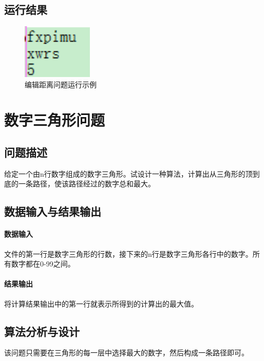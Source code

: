 \documentclass[UTF8]{ctexart}
\begin{document}
    \subsection{运行结果}
    \begin{figure}[!htb]
      \centering
      \includegraphics[width=0.3\textwidth]{../img/2.PNG}
      \caption{编辑距离问题运行示例}\label{编辑距离问题运行示例}
    \end{figure}

    \section{数字三角形问题}
    \subsection{问题描述}
    给定一个由n行数字组成的数字三角形。试设计一种算法，计算出从三角形的顶到底的一条路径，使该路径经过的数字总和最大。

    \subsection{数据输入与结果输出}
    \paragraph{数据输入}
    文件的第一行是数字三角形的行数，接下来的n行是数字三角形各行中的数字。所有数字都在0-99之间。

    \paragraph{结果输出}
    将计算结果输出中的第一行就表示所得到的计算出的最大值。

    \subsection{算法分析与设计}
    该问题只需要在三角形的每一层中选择最大的数字，然后构成一条路径即可。
\end{document}
